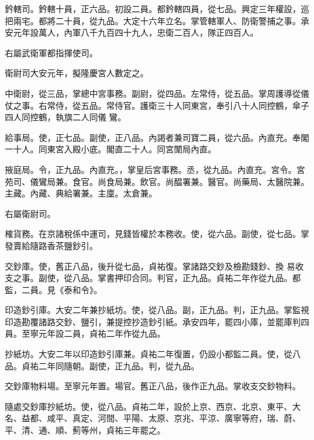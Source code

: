 \begin{pinyinscope}
 鈐轄司。鈐轄十員，正六品。初設二員。都鈐轄四員，從七品。興定三年權設，巡把兩宅。都將二十員，從九品。大定十六年立名。掌管轄軍人、防衛警捕之事。承安元年設萬人，內軍八千九百四十九人，忠衛二百人，隊正四百人。



 右屬武衛軍都指揮使司。



 衛尉司大安元年，擬隆慶宮人數定之。



 中衛尉，從三品，掌總中宮事務。副尉，從四品。左常侍，從五品。掌周護導從儀仗之事。右常侍，從五品。常侍官。護衛三十人同東宮，奉引八十人同控鶴，傘子四人同控鶴，執旗二人同儀
 鸞。



 給事局。使，正七品。副使，正八品。內謁者兼司寶二員，從六品。內直充。奉閣一十人。同東宮入殿小底。閣直二十人。同宮闈局內直。



 掖庭局。令，正九品。內直充。，掌皇后宮事務。丞，從九品。內直充。宮令。宮苑司、儀鸞局兼。食官。尚食局兼。飲官。尚醖署兼。醫官。尚藥局、太醫院兼。主藏。內藏、典給署兼。主廩。太倉兼。



 右屬衛尉司。



 榷貨務。在京諸稅係中運司，見錢皆權於本務收。使，從六品。副使，從七品。掌發賣給隨路香茶鹽鈔引。



 交鈔庫。使，舊正八品，後升從七品，貞祐復。掌諸路交鈔及檢勘錢鈔、換
 易收支之事。副使，從八品。掌書押印合同。判官，正九品。貞祐二年作從九品。都監，二員。見《泰和令》。



 印造鈔引庫。大安二年兼抄紙坊。使，從八品。副，正九品。判，正九品。掌監視印造勘覆諸路交鈔、鹽引，兼提控抄造鈔引紙。承安四年，罷四小庫，並罷庫判四員。至寧元年設二員，貞祐二年作從九品。



 抄紙坊。大安二年以印造鈔引庫兼。貞祐二年復置，仍設小都監二員。使，從八品。貞祐二年同隨朝。副使，正九品。判，從九品。



 交鈔庫物料場。至寧元年置。場官。舊正八品，後作正九品。掌收支交鈔物料。



 隨處交鈔庫抄紙坊。使，從八品。貞祐二年，設於上京、西京、北京、東平、大名、益都、咸平、真定、河間、平陽、太原、京兆、平涼、廣寧等府，瑞、蔚、平、清、通、順、薊等州，貞祐三年罷之。




\end{pinyinscope}
